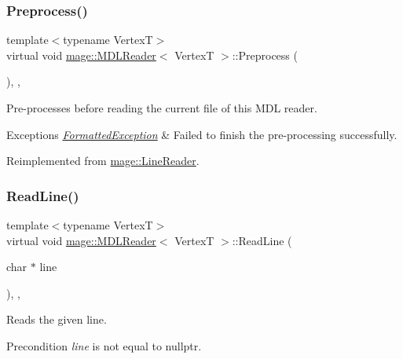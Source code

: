 \subsubsection{\texorpdfstring{Preprocess()}{Preprocess()}}
{\footnotesize\ttfamily template$<$typename VertexT$>$ \\
virtual void \hyperlink{classmage_1_1_m_d_l_reader}{mage\+::\+M\+D\+L\+Reader}$<$ VertexT $>$\+::Preprocess (\begin{DoxyParamCaption}{ }\end{DoxyParamCaption})\hspace{0.3cm}{\ttfamily [override]}, {\ttfamily [private]}, {\ttfamily [virtual]}}

Pre-\/processes before reading the current file of this M\+DL reader.


\begin{DoxyExceptions}{Exceptions}
{\em \hyperlink{structmage_1_1_formatted_exception}{Formatted\+Exception}} & Failed to finish the pre-\/processing successfully. \\
\hline
\end{DoxyExceptions}


Reimplemented from \hyperlink{classmage_1_1_line_reader_a4de135cfb0434be786cfcfd7959031ef}{mage\+::\+Line\+Reader}.

\hypertarget{classmage_1_1_m_d_l_reader_ac50f9cce64621b0a218b6778a611a702}{}\label{classmage_1_1_m_d_l_reader_ac50f9cce64621b0a218b6778a611a702} 
\subsubsection{\texorpdfstring{Read\+Line()}{ReadLine()}}
{\footnotesize\ttfamily template$<$typename VertexT$>$ \\
virtual void \hyperlink{classmage_1_1_m_d_l_reader}{mage\+::\+M\+D\+L\+Reader}$<$ VertexT $>$\+::Read\+Line (\begin{DoxyParamCaption}\item[{char $\ast$}]{line }\end{DoxyParamCaption})\hspace{0.3cm}{\ttfamily [override]}, {\ttfamily [private]}, {\ttfamily [virtual]}}

Reads the given line.

\begin{DoxyPrecond}{Precondition}
{\itshape line} is not equal to {\ttfamily nullptr}. 
\end{DoxyPrecond}

